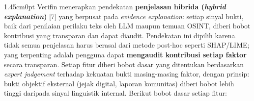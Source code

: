 \documentclass[12pt,a4paper]{article}
\begin{document}
\begin{adjustwidth}{1.45cm}{0pt}
\hspace*{0.85cm}Verifin menerapkan pendekatan \textbf{penjelasan hibrida (\textit{hybrid explanation})} [7] yang
berpusat pada \textit{evidence explanation}: setiap sinyal bukti, baik dari penilaian perilaku
teks oleh LLM maupun temuan OSINT, diberi bobot kontribusi yang transparan dan dapat diaudit. Pendekatan
ini dipilih karena tidak semua penjelasan harus berasal dari metode post-hoc seperti
SHAP/LIME; yang terpenting adalah pengguna dapat \textbf{mengaudit kontribusi setiap faktor}
secara transparan. Setiap fitur diberi bobot dasar yang ditentukan berdasarkan \textit{expert
judgement} terhadap kekuatan bukti masing-masing faktor, dengan prinsip: bukti objektif eksternal
(jejak digital, laporan komunitas) diberi bobot lebih tinggi daripada sinyal linguistik internal.
Berikut bobot dasar setiap fitur:
\end{adjustwidth}
\end{document}
